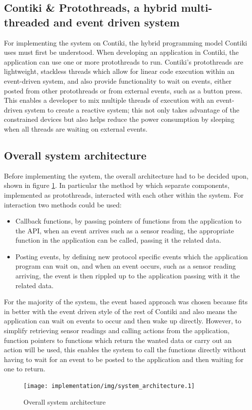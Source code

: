 \subsection{Contiki \& Protothreads, a hybrid multi-threaded and event driven system} %
\label{sub:event_driven_system}
For implementing the system on Contiki, the hybrid programming model Contiki uses must first be understood. When developing an application in Contiki, the application can use one or more protothreads to run. Contiki's protothreads are lightweight, stackless threads which allow for linear code execution within an event-driven system, and also provide functionality to wait on events, either posted from other protothreads or from external events, such as a button press. This enables a developer to mix multiple threads of execution with an event-driven system to create a reactive system; this not only takes advantage of the constrained devices but also helps reduce the power consumption by sleeping when all threads are waiting on external events.

\subsection{Overall system architecture} %
\label{sub:protocol_system_architecture}
Before implementing the system, the overall architecture had to be decided upon, shown in figure \ref{fig:system_architecture}. In particular the method by which separate components, implemented as protothreads, interacted with each other within the system. For interaction two methods could be used:
\begin{itemize}
	\item Callback functions, by passing pointers of functions from the application to the API, when an event arrives such as a sensor reading, the appropriate function in the application can be called, passing it the related data. 
	\item Posting events, by defining new protocol specific events which the application program can wait on, and when an event occurs, such as a sensor reading arriving, the event is then rippled up to the application passing with it the related data.
\end{itemize}

For the majority of the system, the event based approach was chosen because fits in better with the event driven style of the rest of Contiki and also means the application can wait on events to occur and then wake up directly.
However, to simplify retrieving sensor readings and calling actions from the application, function pointers to functions which return the wanted data or carry out an action will be used, this enables the system to call the functions directly without having to wait for an event to be posted to the application and then waiting for one to return.
\begin{figure}[h!]
\centering
\texttt{[image: implementation/img/system\_architecture.1]}
\caption{Overall system architecture}
\label{fig:system_architecture}
\end{figure}


